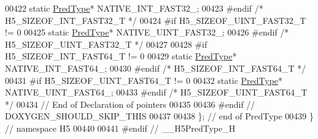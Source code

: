 \begin{DoxyCode}
00422         \textcolor{keyword}{static} \hyperlink{class_h5_1_1_pred_type}{PredType}* NATIVE\_INT\_FAST32\_;
00423 \textcolor{preprocessor}{#endif }\textcolor{comment}{/* H5\_SIZEOF\_INT\_FAST32\_T */}\textcolor{preprocessor}{}
00424 \textcolor{preprocessor}{#if H5\_SIZEOF\_UINT\_FAST32\_T != 0}
00425         \textcolor{keyword}{static} \hyperlink{class_h5_1_1_pred_type}{PredType}* NATIVE\_UINT\_FAST32\_;
00426 \textcolor{preprocessor}{#endif }\textcolor{comment}{/* H5\_SIZEOF\_UINT\_FAST32\_T */}\textcolor{preprocessor}{}
00427 
00428 \textcolor{preprocessor}{#if H5\_SIZEOF\_INT\_FAST64\_T != 0}
00429         \textcolor{keyword}{static} \hyperlink{class_h5_1_1_pred_type}{PredType}* NATIVE\_INT\_FAST64\_;
00430 \textcolor{preprocessor}{#endif }\textcolor{comment}{/* H5\_SIZEOF\_INT\_FAST64\_T */}\textcolor{preprocessor}{}
00431 \textcolor{preprocessor}{#if H5\_SIZEOF\_UINT\_FAST64\_T != 0}
00432         \textcolor{keyword}{static} \hyperlink{class_h5_1_1_pred_type}{PredType}* NATIVE\_UINT\_FAST64\_;
00433 \textcolor{preprocessor}{#endif }\textcolor{comment}{/* H5\_SIZEOF\_UINT\_FAST64\_T */}\textcolor{preprocessor}{}
00434         \textcolor{comment}{// End of Declaration of pointers}
00435 
00436 \textcolor{preprocessor}{#endif // DOXYGEN\_SHOULD\_SKIP\_THIS}
00437 
00438 \}; \textcolor{comment}{// end of PredType}
00439 \} \textcolor{comment}{// namespace H5}
00440 
00441 \textcolor{preprocessor}{#endif // \_\_H5PredType\_H}
\end{DoxyCode}
